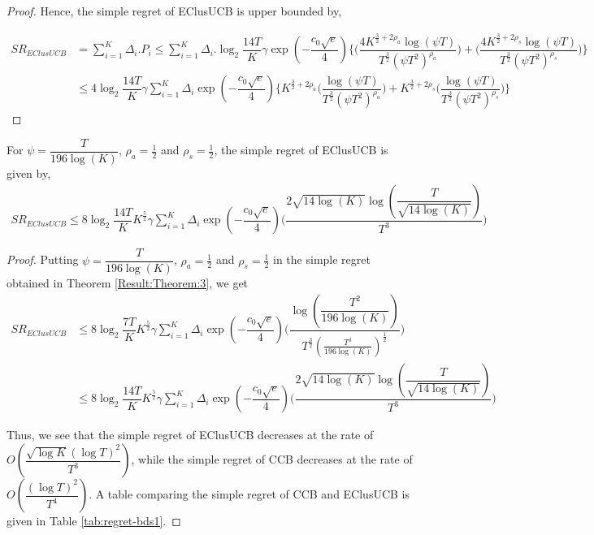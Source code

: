 \begin{proof}
Hence, the simple regret of EClusUCB is upper bounded by,

\begin{align*}
SR_{EClusUCB} &= \sum_{i=1}^{K} \Delta_{i}. P_{i} \leq \sum_{i=1}^{K} \Delta_{i}. \log_{2}\dfrac{14 T}{K}\gamma \exp(-\dfrac{c_{0}\sqrt{e}}{4})\bigg\lbrace\bigg(\dfrac{4K^{\frac{3}{2} +2\rho_{a}}\log (\psi T )}{T^{\frac{3}{2}}(\psi T^2)^{\rho_{a}}}\bigg) + \bigg(\dfrac{4K^{\frac{3}{2} +2\rho_{s}}\log (\psi T )}{T^{\frac{3}{2}}(\psi T^2)^{\rho_{s}}}\bigg)\bigg\rbrace \\
&\leq 4\log_{2}\dfrac{14 T}{K}\gamma \sum_{i=1}^{K} \Delta_{i} \exp(-\dfrac{c_{0}\sqrt{e}}{4}) \bigg\lbrace K^{\frac{3}{2} +2\rho_{a}} \bigg(\dfrac{\log (\psi T )}{T^{\frac{3}{2}}(\psi T^2)^{\rho_{a}}}\bigg) + K^{\frac{3}{2} +2\rho_{s}} \bigg(\dfrac{\log (\psi T )}{T^{\frac{3}{2}}(\psi T^2)^{\rho_{s}}}\bigg) \bigg\rbrace
\end{align*}
\end{proof}


\begin{corollary}
\label{Result:Corollary:3}
For $\psi=\dfrac{T}{196\log (K)}$, $\rho_a=\frac{1}{2}$ and $\rho_s=\frac{1}{2}$, the simple regret of EClusUCB is given by,
\begin{align*}
SR_{EClusUCB} \leq 8 \log_{2}\dfrac{14 T}{K} K^{\frac{5}{2}} \gamma \sum_{i=1}^{K} \Delta_{i} \exp(-\dfrac{c_{0}\sqrt{e}}{4})   \bigg(\dfrac{2 \sqrt{14\log (K)} \log (\dfrac{T}{\sqrt{14\log (K)}} )}{T^{3}}\bigg)
\end{align*}
\end{corollary}

\begin{proof}
Putting $\psi=\dfrac{T}{196 \log (K)}$, $\rho_a=\frac{1}{2}$ and $\rho_s=\frac{1}{2}$ in the simple regret obtained in Theorem \ref{Result:Theorem:3}, we get
\begin{align*}
SR_{EClusUCB} &\leq 8 \log_{2}\dfrac{7T}{K} K^{\frac{5}{2}} \gamma \sum_{i=1}^{K} \Delta_{i} \exp(-\dfrac{c_{0}\sqrt{e}}{4})   \bigg(\dfrac{\log (\dfrac{T^{2}}{196 \log (K)} )}{T^{\frac{3}{2}}(\frac{T^3}{196\log (K)})^{\frac{1}{2}}}\bigg)\\
& \leq 8 \log_{2}\dfrac{14 T}{K} K^{\frac{5}{2}} \gamma  \sum_{i=1}^{K} \Delta_{i} \exp(-\dfrac{c_{0}\sqrt{e}}{4}) \bigg(\dfrac{2 \sqrt{14\log (K)} \log (\dfrac{T}{\sqrt{14\log (K)}} )}{T^{3}}\bigg)
\end{align*} 

Thus, we see that the simple regret of EClusUCB decreases at the rate of $O\left( \dfrac{\sqrt{\log K}(\log T)^2}{T^3} \right)$, while the simple regret of CCB decreases at the rate of $O\left( \dfrac{(\log T)^2}{T^4} \right)$. A table comparing the simple regret of CCB and EClusUCB is given in Table \ref{tab:regret-bds1}.

\end{proof}

